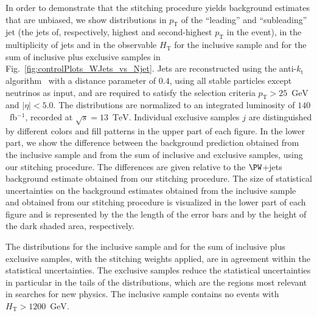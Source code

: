 \documentclass[twocolumn,epjc3]{svjour3}
\newcommand{\pT}{\ensuremath{p_{\textrm{T}}}\xspace}
\newcommand{\kt}{\ensuremath{k_{\textrm{t}}}\xspace}
\newcommand{\HT}{\ensuremath{H_{\mathrm{T}}}\xspace}
\newcommand{\GeV}{\ensuremath{\textrm{GeV}}\xspace}
\newcommand{\TeV}{\ensuremath{\textrm{TeV}}\xspace}
\begin{document}
In order to demonstrate that the stitching procedure yields background estimates that are unbiased,
we show distributions in $\pT$ of the ``leading'' and ``subleading'' jet (the jets of, respectively, highest and second-highest $\pT$ in the event),
in the multiplicity of jets and in the observable $\HT$ 
for the inclusive sample and for the sum of inclusive plus exclusive samples in Fig.~\ref{fig:controlPlots_WJets_vs_Njet}.
Jets are reconstructed using the anti-\kt algorithm~\cite{Cacciari:2008gp,Cacciari:2011ma} with a distance parameter of $0.4$,
using all stable particles except neutrinos as input, and are required to satisfy the selection criteria $\pT > 25$~\GeV and $\vert\eta\vert < 5.0$.
The distributions are normalized to an integrated luminosity of $140$~fb$^{-1}$, recorded at $\sqrt{s}=13$~\TeV.
Individual exclusive samples $j$ are distinguished by different colors and fill patterns in the upper part of each figure.
In the lower part, we show the difference between the background prediction obtained from the inclusive sample and from the sum of inclusive and exclusive samples,
using our stitching procedure.
The differences are given relative to the $\PW$+jets background estimate obtained from our stitching procedure.
The size of statistical uncertainties on the background estimates obtained from the inclusive sample and obtained from our stitching procedure
is visualized in the lower part of each figure and is represented by the the length of the error bars and by the height of the dark shaded area, respectively.

The distributions for the inclusive sample and for the sum of inclusive plus exclusive samples, with the stitching weights applied, are in agreement within the statistical uncertainties.
The exclusive samples reduce the statistical uncertainties in particular in the tails of the distributions,
which are the regions most relevant in searches for new physics.
The inclusive sample contains no events with $\HT > 1200$~\GeV. 
\end{document}
